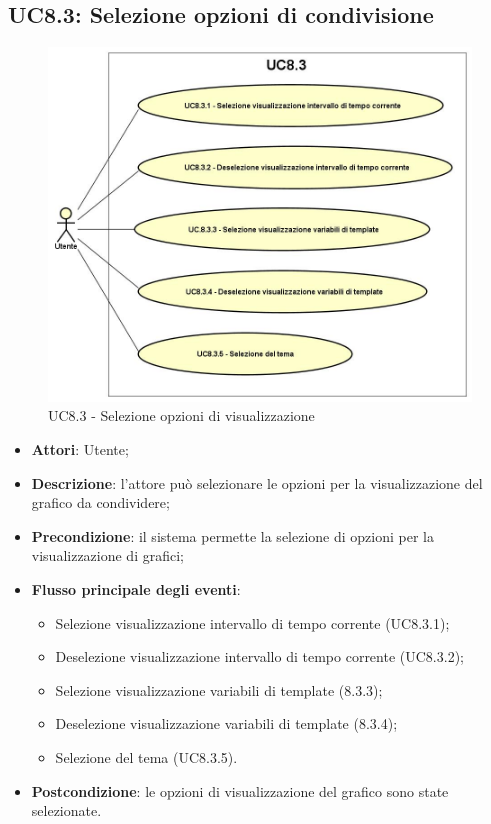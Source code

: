 \subsection{UC8.3: Selezione opzioni di condivisione}
\hypertarget{UC8.3}{}
\begin{figure} [H]
	\centering
	\includegraphics[scale=0.45]{Img/UC8-3}
	\caption{UC8.3 - Selezione opzioni di visualizzazione}\label{}
\end{figure}
\begin{itemize}
	\item \textbf{Attori}: Utente;
	\item \textbf{Descrizione}: l'attore può selezionare le opzioni per la visualizzazione del grafico da condividere;
	\item \textbf{Precondizione}: il sistema permette la selezione di opzioni per la visualizzazione di grafici;
	\item \textbf{Flusso principale degli eventi}:
	\begin{itemize}
		\item Selezione visualizzazione intervallo di tempo corrente (UC8.3.1);
		\item Deselezione visualizzazione intervallo di tempo corrente (UC8.3.2);
		\item Selezione visualizzazione variabili di template (8.3.3);
		\item Deselezione visualizzazione variabili di template (8.3.4);
		\item Selezione del tema (UC8.3.5).
	\end{itemize}
	\item \textbf{Postcondizione}: le opzioni di visualizzazione del grafico sono state selezionate.
\end{itemize}

